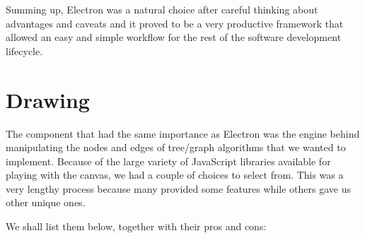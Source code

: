\documentclass{l4proj}
\begin{document}
Summing up, Electron was a natural choice after careful thinking about advantages and caveats and it proved to be a very productive framework that allowed an easy and simple workflow for the rest of the software development lifecycle.

\section{Drawing}

The component that had the same importance as Electron was the engine behind manipulating the nodes and edges of tree/graph algorithms that we wanted to implement. Because of the large variety of JavaScript libraries available for playing with the canvas, we had a couple of choices to select from. This was a very lengthy process because many provided some features while others gave us other unique ones. 

We shall list them below, together with their pros and cons:
\end{document}
